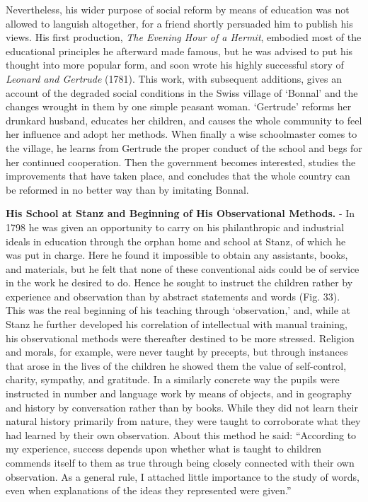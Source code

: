 \documentclass[
]{book}
\begin{document}
Nevertheless, his wider purpose of social reform by means of education was not allowed to languish altogether, for a friend shortly persuaded him to publish his views. His first production, \emph{The Evening Hour of a Hermit}, embodied most of the educational principles he afterward made famous, but he was advised to put his thought into more popular form, and soon wrote his highly successful story of \emph{Leonard and Gertrude} (1781). This work, with subsequent additions, gives an account of the degraded social conditions in the Swiss village of `Bonnal' and the changes wrought in them by one simple peasant woman. `Gertrude' reforms her drunkard husband, educates her children, and causes the whole community to feel her influence and adopt her methods. When finally a wise schoolmaster comes to the village, he learns from Gertrude the proper conduct of the school and begs for her continued cooperation. Then the government becomes interested, studies the improvements that have taken place, and concludes that the whole country can be reformed in no better way than by imitating Bonnal.

\textbf{His School at Stanz and Beginning of His Observational Methods.} - In 1798 he was given an opportunity to carry on his philanthropic and industrial ideals in education through the orphan home and school at Stanz, of which he was put in charge. Here he found it impossible to obtain any assistants, books, and materials, but he felt that none of these conventional aids could be of service in the work he desired to do. Hence he sought to instruct the children rather by experience and observation than by abstract statements and words (Fig. 33). This was the real beginning of his teaching through `observation,' and, while at Stanz he further developed his correlation of intellectual with manual training, his observational methods were thereafter destined to be more stressed. Religion and morals, for example, were never taught by precepts, but through instances that arose in the lives of the children he showed them the value of self-control, charity, sympathy, and gratitude. In a similarly concrete way the pupils were instructed in number and language work by means of objects, and in geography and history by conversation rather than by books. While they did not learn their natural history primarily from nature, they were taught to corroborate what they had learned by their own observation. About this method he said: ``According to my experience, success depends upon whether what is taught to children commends itself to them as true through being closely connected with their own observation. As a general rule, I attached little importance to the study of words, even when explanations of the ideas they represented were given.''
\end{document}
